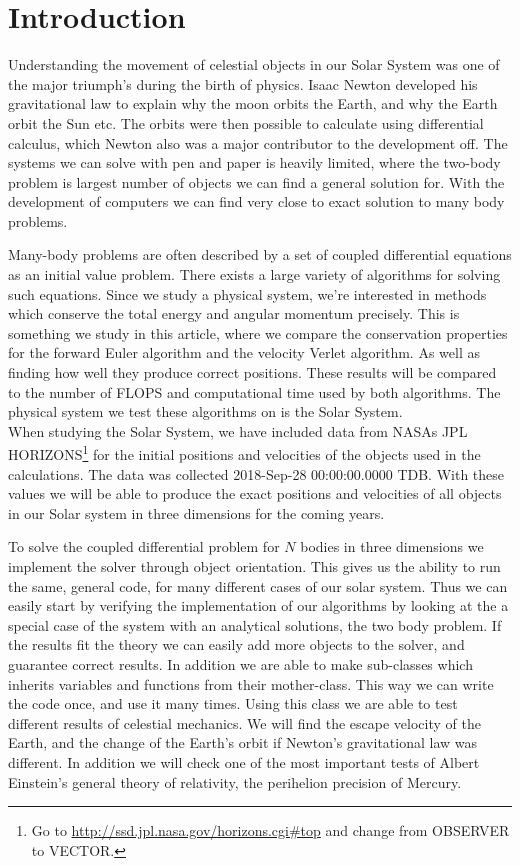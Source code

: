 \documentclass[%
 reprint,
nofootinbib,
aps,
]{revtex4-1}
\begin{document}
\section{Introduction}
Understanding the movement of celestial objects in our Solar System was one of the major triumph's during the birth of physics. Isaac Newton developed his gravitational law to explain why the moon orbits the Earth, and why the Earth orbit the Sun etc. The orbits were then possible to calculate using differential calculus, which Newton also was a major contributor to the development off. The systems we can solve with pen and paper is heavily limited, where the two-body problem is largest number of objects we can find a general solution for. With the development of computers we can find very close to exact solution to many body problems.\par Many-body problems are often described by a set of coupled differential equations as an initial value problem. There exists a large variety of algorithms for solving such equations. Since we study a physical system, we're interested in methods which conserve the total energy and angular momentum precisely. This is something we study in this article, where we compare the conservation properties for the forward Euler algorithm and the velocity Verlet algorithm. As well as finding how well they produce correct positions. These results will be compared to the number of FLOPS and computational time used by both algorithms. The physical system we test these algorithms on is the Solar System.\\

When studying the Solar System, we have included data from NASAs JPL HORIZONS\footnote{Go to \url{http://ssd.jpl.nasa.gov/horizons.cgi#top} and change from OBSERVER to VECTOR.} for the initial positions and velocities of the objects used in the calculations. The data was collected 2018-Sep-28 00:00:00.0000 TDB. With these values we will be able to produce the exact positions and velocities of all objects in our Solar system in three dimensions for the coming years.

To solve the coupled differential problem for $N$ bodies in three dimensions we implement the solver through object orientation. This gives us the ability to run the same, general code, for many different cases of our solar system. Thus we can easily start by verifying the implementation of our algorithms by looking at the a special case of the system with an analytical solutions, the two body problem. If the results fit the theory we can easily add more objects to the solver, and guarantee correct results. In addition we are able to make sub-classes which inherits variables and functions from their mother-class. This way we can write the code once, and use it many times. Using this class we are able to test different results of celestial mechanics. We will find the escape velocity of the Earth, and the change of the Earth's orbit if Newton's gravitational law was different. In addition we will check one of the most important tests of Albert Einstein's general theory of relativity, the perihelion precision of Mercury.
\end{document}
